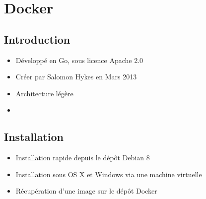 \documentclass{beamer}
\begin{document}
    
    
    
    
    
    
    
    
    
    
    
    
    
    
    
    
    
    
    
    
    
    
    
    
    
    
    
    
    
    
    
    
    
    
    
    
    
    \section{Docker}
    \subsection{Introduction}
    \begin{frame}
       \begin{itemize}
          \item{Développé en Go, sous licence Apache 2.0}
          \item{Créer par Salomon Hykes en Mars 2013}
          \item{Architecture légère}
          \item{}
       \end{itemize}
    \end{frame}

    \subsection{Installation}
    \begin{frame}
       \begin{itemize}
          \item{Installation rapide depuis le dépôt Debian 8}
          \item{Installation sous OS X et Windows via une machine virtuelle}
          \item{Récupération d'une image sur le dépôt Docker}
       \end{itemize}
    \end{frame}
\end{document}
